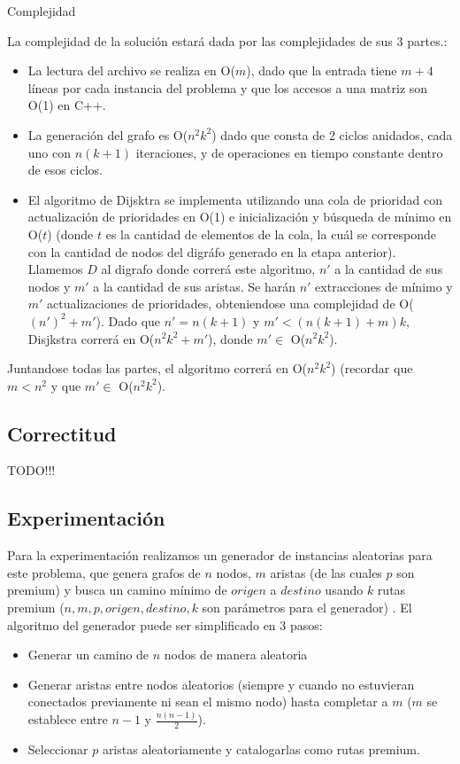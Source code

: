 \begin{subsection}{Complejidad}

La complejidad de la solución estará dada por las complejidades de sus 3 partes.:
\begin{itemize}
\item La lectura del archivo se realiza en O($m$), dado que la entrada tiene $m+4$ líneas por cada instancia del problema y que los accesos a una matriz son O(1) en C++. 
\item La generación del grafo es O($n^2k^2$) dado que consta de 2 ciclos anidados, cada uno con $n(k+1)$ iteraciones, y de operaciones en tiempo constante dentro de esos ciclos.
\item El algoritmo de Dijsktra se implementa utilizando una cola de prioridad con actualización de prioridades en O(1) e inicialización y búsqueda de mínimo en O($t$) (donde $t$ es la cantidad de elementos de la cola, la cuál se corresponde con la cantidad de nodos del digráfo generado en la etapa anterior). Llamemos $D$ al digrafo donde correrá este algoritmo, $n'$ a la cantidad de sus nodos y $m'$ a la cantidad de sus aristas. Se harán $n'$ extracciones de mínimo y $m'$ actualizaciones de prioridades, obteniendose una complejidad de O($(n')^2 + m'$). Dado que $n' = n(k+1)$ y $m' <  (n(k+1)+m)k$, Disjkstra correrá en O($n^2k^2 + m'$), donde $m' \in$ O($n^2k^2$). 
\end{itemize}

Juntandose todas las partes, el algoritmo correrá en O($n^2k^2$) (recordar que $m < n^2$ y que $m' \in $ O($n^2k^2$).

\subsection{Correctitud}
TODO!!!

\subsection{Experimentaci\'{o}n}

Para la experimentaci\'{o}n realizamos un generador de instancias aleatorias para este problema, que genera grafos de $n$ nodos, $m$ aristas (de las cuales $p$ son premium) y busca un camino m\'{i}nimo de $origen$ a $destino$ usando $k$ rutas premium ($n, m, p, origen, destino, k$ son par\'{a}metros para el generador) . El algoritmo del generador puede ser simplificado en 3 pasos:
\begin{itemize}
	\item Generar un camino de $n$ nodos de manera aleatoria
    \item Generar aristas entre nodos aleatorios (siempre y cuando no estuvieran conectados previamente ni sean el mismo nodo) hasta completar a $m$ ($m$ se establece entre $n-1$ y $\frac{n(n-1)}{2}$).
    \item Seleccionar $p$ aristas aleatoriamente y catalogarlas como rutas premium.
\end{itemize}


\end{subsection}
